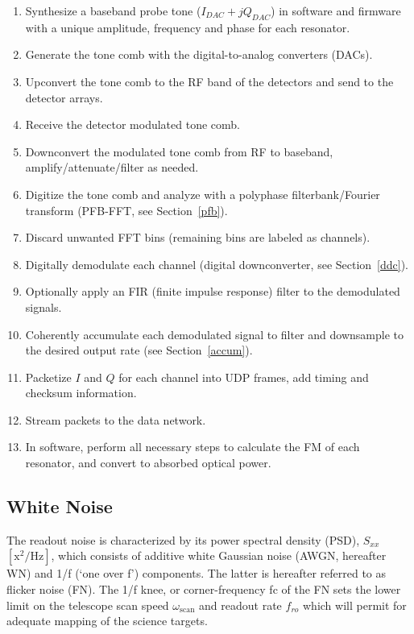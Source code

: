 \begin{enumerate}[nosep]
  \item Synthesize a baseband probe tone ($I_{DAC} + jQ_{DAC}$) in software and firmware with a unique amplitude, frequency and phase for each resonator.
  \item Generate the tone comb with the digital-to-analog converters (DACs).
  \item Upconvert the tone comb to the RF band of the detectors and send to the detector arrays.
  \item Receive the detector modulated tone comb.
  \item Downconvert the modulated tone comb from RF to baseband, amplify/attenuate/filter as needed.
  \item Digitize the tone comb and analyze with a polyphase filterbank/Fourier transform (PFB-FFT, see Section~\ref{pfb}).
  \item Discard unwanted FFT bins (remaining bins are labeled as channels).
  \item Digitally demodulate each channel (digital downconverter, see Section~\ref{ddc}).
  \item Optionally apply an FIR (finite impulse response) filter to the demodulated signals.
  \item Coherently accumulate each demodulated signal to filter and downsample to the desired output rate (see Section~\ref{accum}).
  \item Packetize $I$ and $Q$ for each channel into UDP frames, add timing and checksum information.
  \item Stream packets to the data network.
  \item In software, perform all necessary steps to calculate the FM of each resonator, and convert to absorbed optical power.
\end{enumerate}

\vspace{5mm}

\subsection{White Noise}\label{white noise}

The readout noise is characterized by its power spectral density (PSD), $S_{xx}$ $\left[\mathrm{x}^{2}/\mathrm{Hz}\right]$, which consists of additive white Gaussian noise (AWGN, hereafter WN) and 1/f (`one over f') components. The latter is hereafter referred to as flicker noise (FN). The 1/f knee, or corner-frequency \gls{fc} of the FN sets the lower limit on the telescope scan speed $\omega_{\mathrm{scan}}$ and readout rate $f_{ro}$ which will permit for adequate mapping of the science targets.

